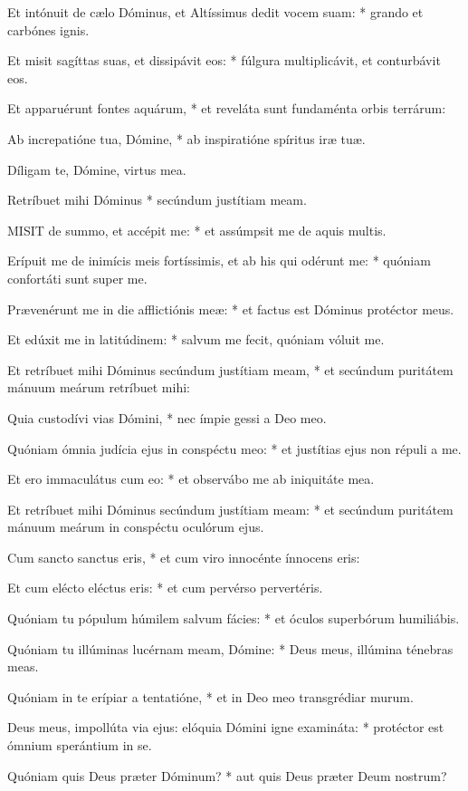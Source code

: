 Et intónuit de cælo Dóminus, et Altíssimus dedit vocem suam: * grando et carbónes ignis.

Et misit sagíttas suas, et dissipávit eos: * fúlgura multiplicávit, et conturbávit eos.

Et apparuérunt fontes aquárum, * et reveláta sunt fundaménta orbis terrárum:

Ab increpatióne tua, Dómine, * ab inspiratióne spíritus iræ tuæ.

 Díligam te, Dómine, virtus mea.

 Retríbuet mihi Dóminus * secúndum justítiam meam.


\lettrine[lines=2]{M}{ISIT} de summo, et accépit me: * et assúmpsit me de aquis multis.

Erípuit me de inimícis meis fortíssimis, et ab his qui odérunt me: * quóniam confortáti sunt super me.

Prævenérunt me in die afflictiónis meæ: * et factus est Dóminus protéctor meus.

Et edúxit me in latitúdinem: * salvum me fecit, quóniam vóluit me.

Et retríbuet mihi Dóminus secúndum justítiam meam, * et secúndum puritátem mánuum meárum retríbuet mihi:

Quia custodívi vias Dómini, * nec ímpie gessi a Deo meo.

Quóniam ómnia judícia ejus in conspéctu meo: * et justítias ejus non répuli a me.

Et ero immaculátus cum eo: * et observábo me ab iniquitáte mea.

Et retríbuet mihi Dóminus secúndum justítiam meam: * et secúndum puritátem mánuum meárum in conspéctu oculórum ejus.

Cum sancto sanctus eris, * et cum viro innocénte ínnocens eris:

Et cum elécto eléctus eris: * et cum pervérso pervertéris.

Quóniam tu pópulum húmilem salvum fácies: * et óculos superbórum humiliábis.

Quóniam tu illúminas lucérnam meam, Dómine: * Deus meus, illúmina ténebras meas.

Quóniam in te erípiar a tentatióne, * et in Deo meo transgrédiar murum.

Deus meus, impollúta via ejus: elóquia Dómini igne examináta: * protéctor est ómnium sperántium in se.

Quóniam quis Deus præter Dóminum? * aut quis Deus præter Deum nostrum?

